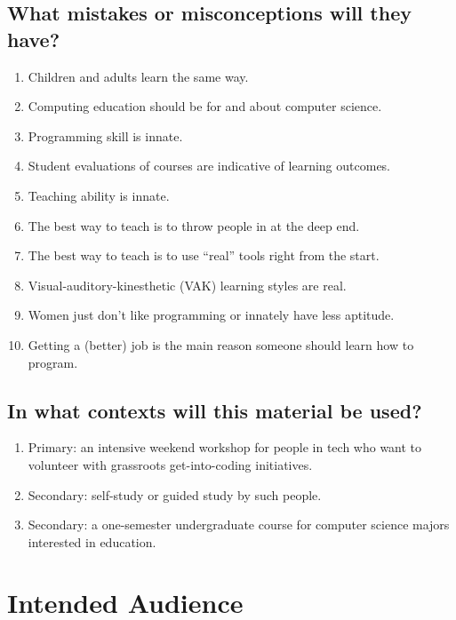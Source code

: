\subsection*{What mistakes or misconceptions will they have?}

  \begin{enumerate}
  \item
    Children and adults learn the same way.
  \item
    Computing education should be for and about computer science.
  \item
    Programming skill is innate.
  \item
    Student evaluations of courses are indicative of learning
    outcomes.
  \item
    Teaching ability is innate.
  \item
    The best way to teach is to throw people in at the deep end.
  \item
    The best way to teach is to use ``real'' tools right from the
    start.
  \item
    Visual-auditory-kinesthetic (VAK) learning styles are real.
  \item
    Women just don't like programming or innately have less
    aptitude.
  \item
    Getting a (better) job is the main reason someone should learn
    how to program.
  \end{enumerate}

\subsection*{In what contexts will this material be used?}

  \begin{enumerate}
  \item
    Primary: an intensive weekend workshop for people in tech who
    want to volunteer with grassroots get-into-coding initiatives.
  \item
    Secondary: self-study or guided study by such people.
  \item
    Secondary: a one-semester undergraduate course for computer
    science majors interested in education.
  \end{enumerate}

\section{Intended Audience}\label{intended-audience}

